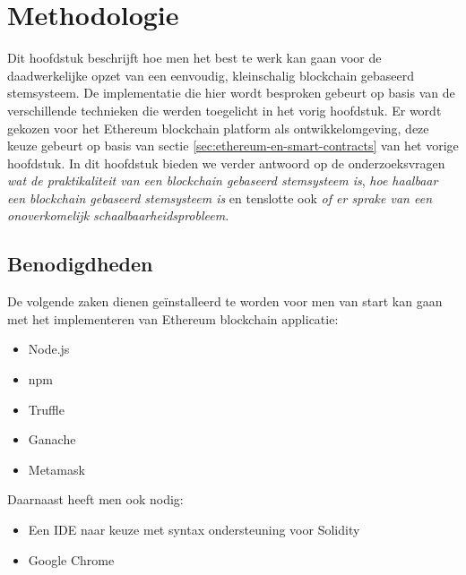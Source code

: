 
\chapter{Methodologie}
\label{ch:methodologie}

Dit hoofdstuk beschrijft hoe men het best te werk kan gaan voor de daadwerkelijke opzet van een eenvoudig, kleinschalig blockchain gebaseerd stemsysteem. De implementatie die hier wordt besproken gebeurt op basis van de verschillende technieken die werden toegelicht in het vorig hoofdstuk. Er wordt gekozen voor het Ethereum blockchain platform als ontwikkelomgeving, deze keuze gebeurt op basis van sectie \ref{sec:ethereum-en-smart-contracts} van het vorige hoofdstuk. In dit hoofdstuk bieden we verder antwoord op de onderzoeksvragen \textit{wat de praktikaliteit van een blockchain gebaseerd stemsysteem is}, \textit{hoe haalbaar een blockchain gebaseerd stemsysteem is} en tenslotte ook \textit{of er sprake van een onoverkomelijk schaalbaarheidsprobleem}.

\section{Benodigdheden}
\label{sec:benodigdheden}
De volgende zaken dienen geïnstalleerd te worden voor men van start kan gaan met het implementeren van Ethereum blockchain applicatie:
\begin{itemize}
	\item{Node.js}
	\item{npm}
	\item{Truffle}
	\item{Ganache}
	\item{Metamask}
\end{itemize}
Daarnaast heeft men ook nodig:
\begin{itemize}
	\item{Een IDE naar keuze met syntax ondersteuning voor Solidity}
	\item{Google Chrome}
\end{itemize}

